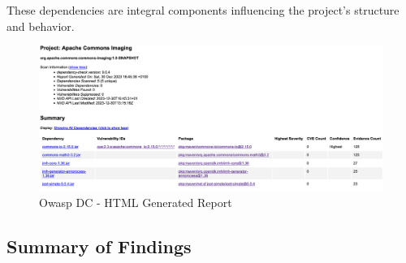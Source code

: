 \documentclass[sigconf]{acmart}
\begin{document}
These dependencies are integral components influencing the project's structure and behavior.


\begin{figure}[h!]
    \centering
    \includegraphics[width=1\linewidth,height=0.7\linewidth]{reportOwaspDC.png}
    \caption{Owasp DC - HTML Generated Report}
    \label{fig:enter-label}
\end{figure}


\subsection{Summary of Findings}
\end{document}
